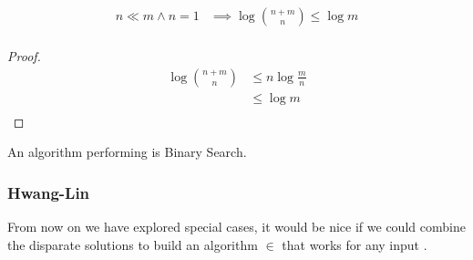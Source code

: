 \begin{lemma}
\begin{align*}
n \ll m \land n = 1 &\implies \log\binom{n+m}{n} \leq \log m\\
\end{align*}
\end{lemma}

\begin{proof}
\begin{align*}
\log\binom{n+m}{n} &\leq n \log\frac{m}{n}\\
&\leq \log m\\
\end{align*}
\end{proof}

An algorithm performing  is Binary Search.

\subsubsection{Hwang-Lin}

From now on we have explored special cases, it would be nice if we could combine the disparate solutions to build an algorithm $\in$  that works for any input .